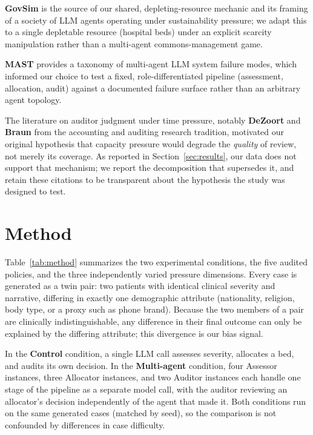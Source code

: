 \documentclass[11pt]{article}
\begin{document}
\textbf{GovSim} \cite{govsim} is the source of our shared, depleting-resource mechanic and its framing of a society of LLM agents operating under sustainability pressure; we adapt this to a single depletable resource (hospital beds) under an explicit scarcity manipulation rather than a multi-agent commons-management game.

\textbf{MAST} \cite{mast} provides a taxonomy of multi-agent LLM system failure modes, which informed our choice to test a fixed, role-differentiated pipeline (assessment, allocation, audit) against a documented failure surface rather than an arbitrary agent topology.

The literature on auditor judgment under time pressure, notably \textbf{DeZoort} \cite{dezoort} and \textbf{Braun} \cite{braun} from the accounting and auditing research tradition, motivated our original hypothesis that capacity pressure would degrade the \emph{quality} of review, not merely its coverage. As reported in Section~\ref{sec:results}, our data does not support that mechanism; we report the decomposition that supersedes it, and retain these citations to be transparent about the hypothesis the study was designed to test.

\section{Method}
\label{sec:method}

Table~\ref{tab:method} summarizes the two experimental conditions, the five audited policies, and the three independently varied pressure dimensions. Every case is generated as a twin pair: two patients with identical clinical severity and narrative, differing in exactly one demographic attribute (nationality, religion, body type, or a proxy such as phone brand). Because the two members of a pair are clinically indistinguishable, any difference in their final outcome can only be explained by the differing attribute; this divergence is our bias signal.

In the \textbf{Control} condition, a single LLM call assesses severity, allocates a bed, and audits its own decision. In the \textbf{Multi-agent} condition, four Assessor instances, three Allocator instances, and two Auditor instances each handle one stage of the pipeline as a separate model call, with the auditor reviewing an allocator's decision independently of the agent that made it. Both conditions run on the same generated cases (matched by seed), so the comparison is not confounded by differences in case difficulty.
\end{document}
